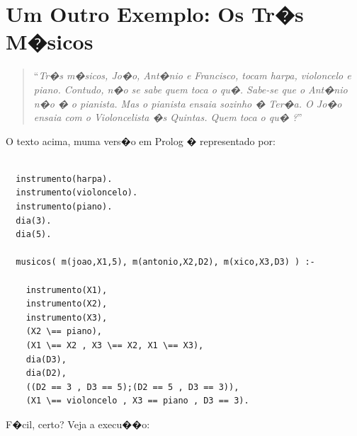 \documentclass[final,a4paper]{article}
\begin{document}
\section{Um Outro Exemplo:  Os Tr�s M�sicos}


\begin{quotation}
``{\em  Tr�s m�sicos, Jo�o, Ant�nio e Francisco, tocam harpa, violoncelo e piano.
  Contudo, n�o se sabe quem toca o qu�. Sabe-se que o  Ant�nio n�o � o
  pianista. Mas o pianista ensaia sozinho � Ter�a. O Jo�o ensaia com o
  Violoncelista �s Quintas. Quem toca o qu� ?}''
\end{quotation}

O texto acima, muma vers�o 
 em Prolog � representado por: 


\begin{lstlisting}

  instrumento(harpa).
  instrumento(violoncelo).
  instrumento(piano).
  dia(3).
  dia(5).
  
  musicos( m(joao,X1,5), m(antonio,X2,D2), m(xico,X3,D3) ) :-
      
    instrumento(X1),
    instrumento(X2),
    instrumento(X3),
    (X2 \== piano),
    (X1 \== X2 , X3 \== X2, X1 \== X3),
    dia(D3),
    dia(D2),
    ((D2 == 3 , D3 == 5);(D2 == 5 , D3 == 3)),
    (X1 \== violoncelo , X3 == piano , D3 == 3).
\end{lstlisting}

F�cil, certo? Veja a execu��o:

\end{document}
